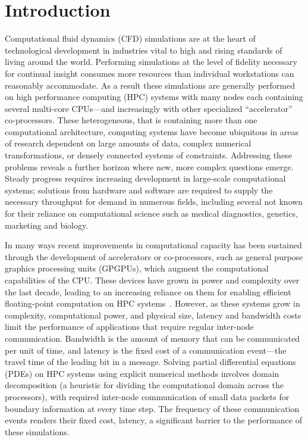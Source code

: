 \section{Introduction}

Computational fluid dynamics (CFD) simulations are at the heart of technological development in industries vital to high and rising standards of living around the world.
Performing simulations at the level of fidelity necessary for continual insight consumes more resources than individual workstations can reasonably accommodate.
As a result these simulations are generally performed on high performance computing (HPC) systems with many nodes each containing several multi-core CPUs---and increasingly with other specialized ``accelerator'' co-processors.
These heterogeneous, that is containing more than one computational architecture, computing systems have become ubiquitous in areas of research dependent on large amounts of data, complex numerical transformations, or densely connected systems of constraints.
Addressing these problems reveals a further horizon where new, more complex questions emerge.
Steady progress requires increasing development in large-scale computational systems; solutions from hardware and software are required to supply the necessary throughput for demand in numerous fields, including several not known for their reliance on computational science such as medical diagnostics, genetics, marketing and biology.

In many ways recent improvements in computational capacity has been sustained through the development of accelerators or co-processors, such as general purpose graphics processing units (GPGPUs), which augment the computational capabilities of the CPU.
These devices have grown in power and complexity over the last decade, leading to an increasing reliance on them for enabling efficient floating-point computation on HPC systems~\cite{ALEXANDROV20161}.
However, as these systems grow in complexity, computational power, and physical size, latency and bandwidth costs limit the performance of applications that require regular inter-node communication.
Bandwidth is the amount of memory that can be communicated per unit of time, and latency is the fixed cost of a communication event---the travel time of the leading bit in a message.
Solving partial differential equations (PDEs) on HPC systems using explicit numerical methods involves domain decomposition (a heuristic for dividing the computational domain across the processors), with required inter-node communication of small data packets for boundary information at every time step.
The frequency of these communication events renders their fixed cost, latency, a significant barrier to the performance of these simulations.

